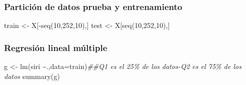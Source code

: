 \documentclass[
  letterpaper,
  DIV=11,
  numbers=noendperiod]{scrartcl}
\newenvironment{Shaded}{\begin{snugshade}}{\end{snugshade}}
\newcommand{\AttributeTok}[1]{\textcolor[rgb]{0.40,0.45,0.13}{#1}}
\newcommand{\DecValTok}[1]{\textcolor[rgb]{0.68,0.00,0.00}{#1}}
\newcommand{\DocumentationTok}[1]{\textcolor[rgb]{0.37,0.37,0.37}{\textit{#1}}}
\newcommand{\FunctionTok}[1]{\textcolor[rgb]{0.28,0.35,0.67}{#1}}
\newcommand{\NormalTok}[1]{\textcolor[rgb]{0.00,0.23,0.31}{#1}}
\newcommand{\OtherTok}[1]{\textcolor[rgb]{0.00,0.23,0.31}{#1}}
\newcommand{\SpecialCharTok}[1]{\textcolor[rgb]{0.37,0.37,0.37}{#1}}
\begin{document}
\hypertarget{particiuxf3n-de-datos-prueba-y-entrenamiento}{%
\subsubsection{Partición de datos prueba y
entrenamiento}\label{particiuxf3n-de-datos-prueba-y-entrenamiento}}

\begin{Shaded}
\begin{Highlighting}[]
\NormalTok{train }\OtherTok{\textless{}{-}}\NormalTok{ X[}\SpecialCharTok{{-}}\FunctionTok{seq}\NormalTok{(}\DecValTok{10}\NormalTok{,}\DecValTok{252}\NormalTok{,}\DecValTok{10}\NormalTok{),]}
\NormalTok{test }\OtherTok{\textless{}{-}}\NormalTok{ X[}\FunctionTok{seq}\NormalTok{(}\DecValTok{10}\NormalTok{,}\DecValTok{252}\NormalTok{,}\DecValTok{10}\NormalTok{),]}
\end{Highlighting}
\end{Shaded}

\hypertarget{regresiuxf3n-lineal-muxfaltiple}{%
\subsubsection{Regresión lineal
múltiple}\label{regresiuxf3n-lineal-muxfaltiple}}

\begin{Shaded}
\begin{Highlighting}[]
\NormalTok{g  }\OtherTok{\textless{}{-}} \FunctionTok{lm}\NormalTok{(siri }\SpecialCharTok{\textasciitilde{}}\NormalTok{.,}\AttributeTok{data=}\NormalTok{train)}\DocumentationTok{\#\#Q1 es el 25\% de los datos{-}Q2 es el 75\% de los datos }
\FunctionTok{summary}\NormalTok{(g)}
\end{Highlighting}
\end{Shaded}
\end{document}
